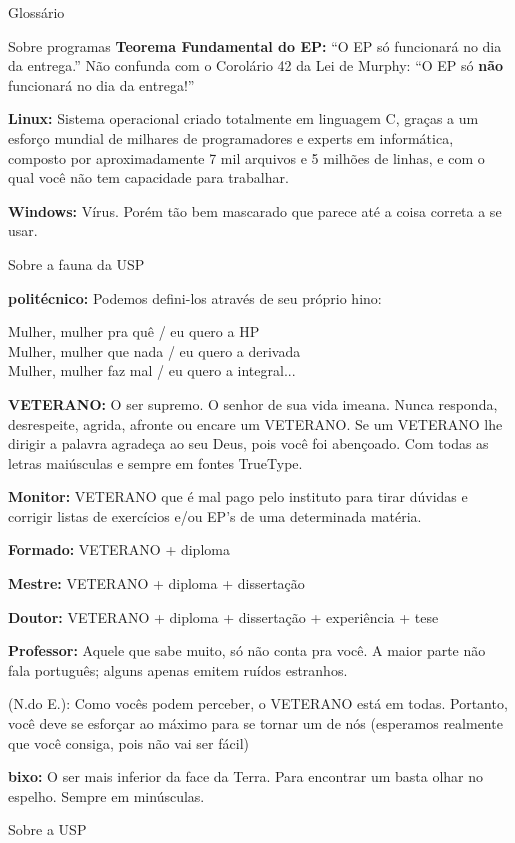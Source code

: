 \begin{secao}{Glossário}
\begin{subsecao}{Sobre programas}
{\bf Teorema Fundamental do EP:} ``O EP só funcionará no dia da entrega.'' Não
confunda com o Corolário 42 da Lei de Murphy: ``O EP só {\bf não} funcionará no
dia da entrega!''

{\bf Linux:} Sistema operacional criado totalmente em linguagem C, graças a um
esforço mundial de milhares de programadores e experts em informática, composto
por aproximadamente 7 mil arquivos e 5 milhões de linhas, e com o qual você não
tem capacidade para trabalhar.

{\bf Windows:} Vírus. Porém tão bem mascarado que parece até a coisa correta a
se usar.
\end{subsecao}

\begin{subsecao}{Sobre a fauna da USP}

{\bf politécnico:} Podemos defini-los através de seu próprio hino: 

Mulher, mulher pra quê / eu quero a HP\\
Mulher, mulher que nada / eu quero a derivada\\
Mulher, mulher faz mal / eu quero a integral...

{\bf VETERANO:} O ser supremo. O senhor de sua vida imeana. Nunca responda,
desrespeite, agrida, afronte ou encare um VETERANO. Se um VETERANO lhe dirigir
a palavra agradeça ao seu Deus, pois você foi abençoado. Com todas as letras
maiúsculas e sempre em fontes TrueType.

{\bf Monitor:} VETERANO que é mal pago pelo instituto para tirar dúvidas e
corrigir listas de exercícios e/ou EP's de uma determinada matéria.

{\bf Formado:} VETERANO + diploma

{\bf Mestre:} VETERANO + diploma + dissertação

{\bf Doutor:} VETERANO + diploma + dissertação + experiência + tese

{\bf Professor:} Aquele que sabe muito, só não conta pra você. A maior parte
não fala português; alguns apenas emitem ruídos estranhos.

(N.do E.): Como vocês podem perceber, o VETERANO está em todas. Portanto, você
deve se esforçar ao máximo para se tornar um de nós (esperamos realmente que
você consiga, pois não vai ser fácil)

{\bf bixo:} O ser mais inferior da face da Terra. Para encontrar um basta olhar
no espelho. Sempre em minúsculas.
\end{subsecao}

\begin{subsecao}{Sobre a USP}


\end{subsecao}
\end{secao}
